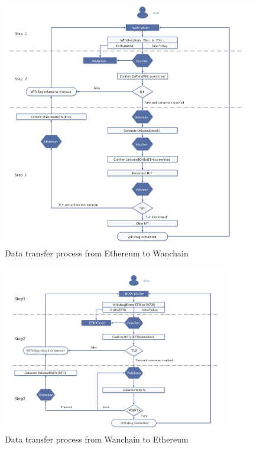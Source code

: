         \begin{figure}[H]
        \includegraphics[width=1\textwidth]{./figures/ethtowan.png}
        \centering
        \caption{{Data transfer process from Ethereum to Wanchain}\protect\footnotemark}
        \centering
        \label{fig:wan1}
        
        \end{figure}
        \begin{figure}[H]
        \includegraphics[width=0.88\textwidth]{./figures/wantoeth.png}
        \centering
        \caption{{Data transfer process from Wanchain to Ethereum}\protect\footnotemark}
        \centering
        \label{fig:wan2}
        
        \end{figure}

